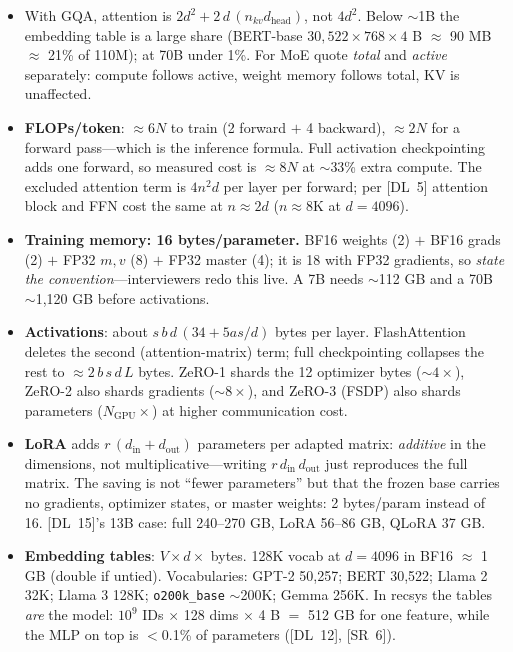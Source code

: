 \begin{itemize}[leftmargin=*,itemsep=1pt]
\item With GQA, attention is $2d^{2} + 2\,d\,(n_{kv} d_{\text{head}})$, not
$4d^{2}$. Below $\sim$1B the embedding table is a large share (BERT-base
$30{,}522 \times 768 \times 4$ B $\approx$ 90 MB $\approx$ 21\% of 110M); at 70B
under 1\%. For MoE quote \emph{total} and \emph{active} separately: compute
follows active, weight memory follows total, KV is unaffected.
\item \textbf{FLOPs/token}: $\approx 6N$ to train (2 forward $+$ 4 backward),
$\approx 2N$ for a forward pass---which is the inference formula. Full
activation checkpointing adds one forward, so measured cost is $\approx 8N$ at
$\sim$33\% extra compute. The excluded attention term is $4n^{2}d$ per layer per
forward; per [DL~5] attention block and FFN cost the same at $n \approx 2d$
($n \approx 8$K at $d = 4096$).
\item \textbf{Training memory: 16 bytes/parameter.} BF16 weights (2) $+$ BF16
grads (2) $+$ FP32 $m,v$ (8) $+$ FP32 master (4); it is 18 with FP32 gradients,
so \emph{state the convention}---interviewers redo this live. A 7B needs
$\sim$112 GB and a 70B $\sim$1{,}120 GB before activations.
\item \textbf{Activations}: about $s\,b\,d\,(34 + 5as/d)$ bytes per layer.
Flash\-Attention deletes the second (attention-matrix) term; full checkpointing
collapses the rest to $\approx 2\,b\,s\,d\,L$ bytes. ZeRO-1 shards the 12
optimizer bytes ($\sim4\times$), ZeRO-2 also shards gradients ($\sim8\times$),
and ZeRO-3 (FSDP) also shards parameters ($N_{\text{GPU}}\times$) at higher
communication cost.
\item \textbf{LoRA} adds $r\,(d_{\text{in}} + d_{\text{out}})$ parameters per
adapted matrix: \emph{additive} in the dimensions, not multiplicative---writing
$r\,d_{\text{in}}\,d_{\text{out}}$ just reproduces the full matrix. The saving
is not ``fewer parameters'' but that the frozen base carries no gradients,
optimizer states, or master weights: 2 bytes/param instead of 16. [DL~15]'s 13B
case: full 240--270 GB, LoRA 56--86 GB, QLoRA 37 GB.
\item \textbf{Embedding tables}: $V \times d \times$ bytes. 128K vocab at
$d{=}4096$ in BF16 $\approx$ 1 GB (double if untied). Vocabularies: GPT-2
50{,}257; BERT 30{,}522; Llama 2 32K; Llama 3 128K; \texttt{o200k\_base}
$\sim$200K; Gemma 256K. In recsys the tables \emph{are} the model: $10^{9}$ IDs
$\times$ 128 dims $\times$ 4 B $=$ 512 GB for one feature, while the MLP on top
is $<$0.1\% of parameters ([DL~12], [SR~6]).
\end{itemize}

